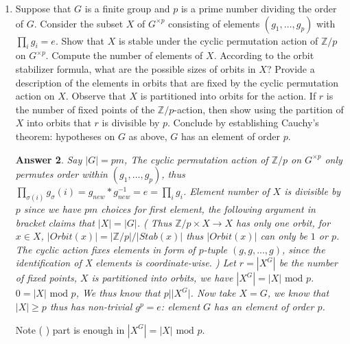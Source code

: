 \documentclass[11pt,leqno]{article}
\newcommand{\Z}{{\mathbb Z}}
\newcommand{\<}[1]{{\langle}#1 {\rangle}}
\theoremstyle{plain}
\newtheorem*{answer*}{Answer}
\theoremstyle{definition}
\theoremstyle{remark}
\numberwithin{equation}{section}
\begin{document}
\begin{enumerate}
\begin{answer*}
    The second part is clear as considering (as in $4$) $\Z[\frac{1}{p}]/\Z \cong \varinjlim_n{\Z/p^n\Z}$, the quotient of form $\Z/p^n\Z$ on right hand side does not impose an action, for right side is the direct limit, that is,  $\frac{\Z[\frac{1}{p}]/\Z}{\Z/p^n\Z} \cong \frac{\varinjlim_n{\Z/p^n\Z}}{{\Z/p^n\Z}}=\varinjlim_n{\Z/p^n\Z}=\Z[\frac{1}{p}]/\Z$.
    \end{answer*} 
    I owe some enlightenment to Remark 2.4.2.2.    


\item Suppose that $G$ is a finite group and $p$ is a prime number dividing the order of $G$.  Consider the subset $X$ of $G^{\times p}$ consisting of elements $(g_1,\ldots,g_p)$ with $\prod_i g_i = e$.  Show that $X$ is stable under the cyclic permutation action of $\Z/p$ on $G^{\times p}$.  Compute the number of elements of $X$. According to the orbit stabilizer formula, what are the possible sizes of orbits in $X$?  Provide a description of the elements in orbits that are fixed by the cyclic permutation action on $X$.  Observe that $X$ is partitioned into orbits for the action. If $r$ is the number of fixed points of the $\Z/p$-action, then show using the partition of $X$ into orbits that $r$ is divisible by $p$.  Conclude by establishing Cauchy's theorem: hypotheses on $G$ as above, $G$ has an element of order $p$.
    \begin{answer*}
    Say $|G|=pm$,
    The cyclic permutation action of $\Z/p$ on $G^{\times p}$ only permutes order within $(g_1,\ldots,g_p)$, thus $\prod_{\sigma(i)} g_\sigma(i)=g_{new}*g_{new}^{-1} = e = \prod_i g_i$. 
    Element number of $X$ is divisible by $p$ since we have $pm$ choices for first element, the following argument in bracket claims that $|X|=|G|$. 
    ( Thus $\Z/p\times X\rightarrow X$ has only one orbit, for $x\in X$, $|Orbit(x)|=|\Z/p|/|Stab(x)|$ thus $|Orbit(x)|$ can only be $1$ or $p$. The cyclic action fixes elements in form of $p$-tuple $(g,g,...,g)$, since the identification of X elements is coordinate-wise. )
    Let $r=|X^G|$ be the number of fixed points, $X$ is partitioned into orbits, we have $|X^G|=|X| \textrm{ mod }p$. $0=|X| \textrm{ mod }p$, We thus know that $p||X^G|$. Now take $X=G$, we know that $|X|\geq p$ thus has non-trivial $g^p=e$: element $G$ has an element of order $p$.
    \end{answer*} Note ( ) part is enough in $|X^G|=|X| \textrm{ mod }p$. 
    

\end{enumerate}
\end{document}
